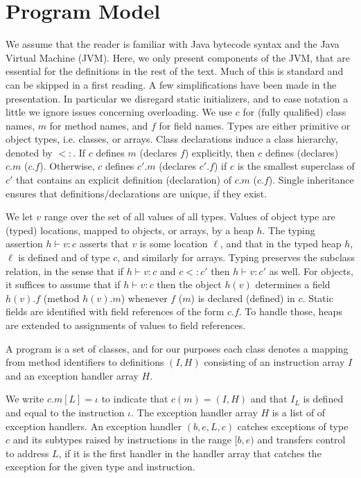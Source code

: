 \documentclass[10pt,twocolumn]{article}
\newcommand{\loca}{\ell}
\newcommand{\tupled}[1]{(#1)}
\begin{document}
\section{Program Model}\label{sect:prog_model}
We assume that the reader is familiar with Java bytecode syntax and the Java Virtual Machine (JVM). Here, we only present components of the JVM, that are essential for the definitions in the rest of the text. Much of this is standard and can be skipped in a first reading. A few simplifications have been made in the presentation. In particular we disregard static initializers, and to ease notation a little we ignore issues concerning overloading. We use $c$ for (fully qualified) class names, $m$ for method names, and $f$ for field names. Types are either primitive or object types, i.e. classes, or arrays. Class declarations induce a class hierarchy, denoted by $<:$. If $c$ defines $m$ (declares $f$) explicitly, then $c$ defines (declares) $c.m$ ($c.f$). Otherwise, $c$ defines $c'.m$ (declares $c'.f$) if $c$ is the smallest superclass of $c'$ that contains an explicit definition (declaration) of  $c.m$ ($c.f$). Single inheritance ensures that definitions/declarations are unique, if they exist.

We let $v$ range over the set of all values of all types. Values of object type are (typed) locations, mapped to objects, or arrays, by a heap $h$. The typing assertion $h\vdash v : c$ asserts that $v$ is some location $\loca$, and that in the typed heap $h$, $\loca$ is defined and of type $c$, and similarly for arrays. Typing preserves the subclass relation, in the sense that if $h\vdash v:c$ and $ c <: c'$ then $h\vdash v:c'$ as well. For objects, it suffices to assume that if $h\vdash v:c$ then the object $h(v)$ determines a field $h(v).f$ (method $h(v).m$) whenever $f$ ($m$) is declared (defined) in $c$. Static fields are identified with field references of the form $c.f$. To handle those, heaps are extended to assignments of values to field references.

A program is a set of classes, and for our purposes each class denotes a mapping from method identifiers to definitions $(I,H)$ consisting of an instruction array $I$ and an exception handler array $H$.

We write $c.m[L] = \iota$ to indicate that $c(m)=(I,H)$ and that $I_L$ is defined and equal to the instruction $\iota$. The exception handler array $H$ is a list of of exception handlers. An exception handler $\tupled{b, e, L, c}$ catches exceptions of type $c$ and its subtypes raised by instructions in the range $[b, e)$ and transfers control to address $L$, if it is the first handler in the handler array that catches the exception for the given type and instruction.
\end{document}
